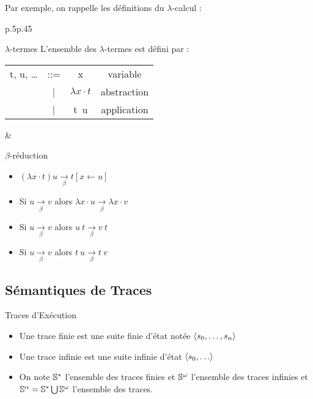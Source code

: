 \documentclass{cours}
\begin{document}
Par exemple, on rappelle les définitions du $\lambda$-calcul :\\\vspace{5pt}
\begin{tabular}{p{.5\linewidth}p{.45\linewidth}}
    \begin{définition}{$\lambda$-termes}{}
        L'ensemble des $\lambda$-termes est défini par :\vspace{10pt}
        \begin{tabular}{cccc}
            t, u, \dots & ::= & x & variable\vspace{3pt}\\
            & | & $\lambda x\cdot t$ & abstraction\vspace{3pt}\\
            & | & t\ u & application\vspace{3pt}
        \end{tabular}
    \end{définition}
    & \begin{définition}{$\beta$-réduction}{}
        \vspace{-3pt}
        \begin{itemize}
            \item $(\lambda x \cdot t) u \xrightarrow[\beta]{} t[x \leftarrow u]$\vspace{-3pt}
            \item Si $u \xrightarrow[\beta]{} v$ alors $\lambda x \cdot u \xrightarrow[\beta]{} \lambda x \cdot v$\vspace{-3pt}
            \item Si $u \xrightarrow[\beta]{} v$ alors $u\ t \xrightarrow[\beta]{} v\ t$\vspace{-3pt}
            \item Si $u \xrightarrow[\beta]{} v$ alors $t\ u \xrightarrow[\beta]{} t\ v$\vspace{-4pt}
        \end{itemize}
    \end{définition}
\end{tabular}
\vspace{-12pt}
\subsection{Sémantiques de Traces}
\begin{définition}{Traces d'Exécution}{}
    \begin{itemize}
        \item Une trace finie est une suite finie d'état notée $\scalar{s_{0}, \ldots, s_{n}}$
        \item Une trace infinie est une suite infinie d'état $\scalar{s_{0},\ldots}$
        \item On note $\S^{*}$ l'ensemble des traces finies et $\S^{\omega}$ l'ensemble des traces infinies et $\S^{\alpha} = \S^{*} \bigcup \S^{\omega}$ l'ensemble des traces.
    \end{itemize}
\end{définition}
\end{document}
